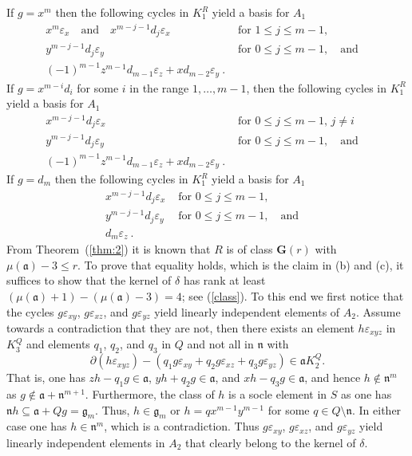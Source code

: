 \documentclass{amsart}
\theoremstyle{bfupright head,upright body}
\theoremstyle{fixed bf head,slanted body}
\theoremstyle{fixed bf head,upright body}
\theoremstyle{numbered paragraph}
\newenvironment{prf*}[1][Proof]{%
  \begin{proof}[\bf #1]
    \setcounter{equation}{0}
    \renewcommand{\theequation}{\arabic{equation}}}
  {\end{proof}
}
\newcommand{\pgref}[1]{(\ref{#1})}
\newcommand{\thmref}[2][Theorem~]{#1\pgref{thm:#2}}
\newcommand{\qtext}[1]{\quad\text{#1}\quad}
\newcommand{\qand}{\qtext{and}}
\newcommand{\n}{\mathfrak{n}}
\newcommand{\clG}[1]{\mathbf{G}(#1)}
\newcommand{\e}[1]{\varepsilon_{#1}}
\newcommand{\fa}{\mathfrak{a}}
\newcommand{\fg}{\mathfrak{g}}
\numberwithin{equation}{res}
\begin{document}
\begin{prf*}
  If $g=x^m$ then the following cycles in $K^R_1$ yield a basis for
  $A_1$
  \begin{align*}
    x^m\e{x} \qand x^{m-j-1}d_j\e{x} & \text{ for } 1 \le j \le m-1, \\
    y^{m-j-1}d_j\e{y} & \text{ for } 0 \le j \le m-1,\qand\\
    (-1)^{m-1}z^{m-1}d_{m-1}\e{z} + xd_{m-2}\e{y}\:.
  \end{align*}
  If $g=x^{m-i}d_i$ for some $i$ in the range $1,\ldots,m-1$, then the
  following cycles in $K^R_1$ yield a basis for $A_1$
  \begin{align*}
    x^{m-j-1}d_j\e{x} & \text{ for } 0 \le j \le m-1,\, j\ne i\\
    y^{m-j-1}d_j\e{y} & \text{ for } 0 \le j \le m-1, \qand\\
    (-1)^{m-1}z^{m-1}d_{m-1}\e{z} + xd_{m-2}\e{y}\:.
  \end{align*}
  If $g=d_m$ then the following cycles in $K^R_1$ yield a basis for
  $A_1$
  \begin{align*}
    x^{m-j-1}d_j\e{x} & \text{ for } 0 \le j \le m-1,\\
    y^{m-j-1}d_j\e{y} & \text{ for } 0 \le j \le m-1,\qand\\
    d_m\e{z}\:.
  \end{align*}
  From \thmref{2} it is known that $R$ is of class $\clG{r}$ with
  $\mu(\fa)-3 \le r$. To prove that equality holds, which is the claim
  in (b) and (c), it suffices to show that the kernel of $\delta$ has
  rank at least $(\mu(\fa) + 1) - (\mu(\fa) - 3) = 4$; see
  \pgref{class}. To this end we first notice that the cycles
  $g\e{xy}$, $g\e{xz}$, and $g\e{yz}$ yield linearly independent
  elements of $A_2$. Assume towards a contradiction that they are not,
  then there exists an element $h\e{xyz}$ in $K_3^Q$ and elements
  $q_1$, $q_2$, and $q_3$ in $Q$ and not all in $\n$ with
  \begin{equation*}
    \partial(h\e{xyz}) - (q_1g\e{xy} + q_2g\e{xz} + q_3g\e{yz}) \in \fa K_2^Q.
  \end{equation*}
  That is, one has $zh -q_1g\in \fa$, $yh + q_2g\in \fa$, and $xh
  -q_3g\in \fa$, and hence $h\not\in\n^m$ as $g \not\in \fa +
  \n^{m+1}$. Furthermore, the class of $h$ is a socle element in $S$
  as one has $\n h \subseteq \fa + Qg = \fg_m$. Thus, $h\in \fg_m$ or
  $h = qx^{m-1}y^{m-1}$ for some $q\in Q\setminus\n$. In either case
  one has $h\in \n^m$, which is a contradiction. Thus $g\e{xy}$,
  $g\e{xz}$, and $g\e{yz}$ yield linearly independent elements in
  $A_2$ that clearly belong to the kernel of $\delta$.


\end{prf*}
\end{document}
